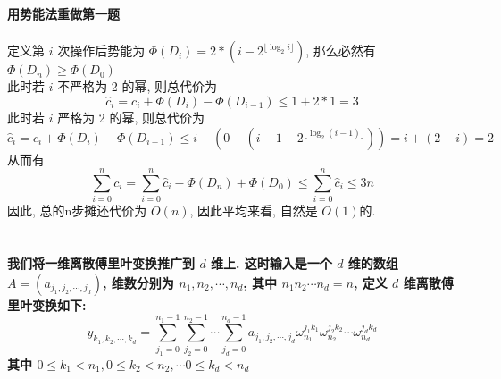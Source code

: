 \documentclass[UTF8]{article}
\newcommand{\jumpLine} {\hspace*{\fill} \\}
\newcommand{\floor}[1]{\lfloor#1\rfloor}
\begin{document}
\section{}
\noindent \textbf{用势能法重做第一题}\\
\jumpLine
定义第 $i$ 次操作后势能为 $\Phi(D_i)=2*(i-2^{\floor{\log_2 i}})$, 那么必然有 $\Phi(D_n)\ge\Phi(D_0)$\\
此时若 $i$ 不严格为 2 的幂, 则总代价为
$$\hat{c}_i=c_i+\Phi(D_i)-\Phi(D_{i-1})\le 1+2*1=3$$
此时若 $i$ 严格为 2 的幂, 则总代价为
$$\hat{c}_i=c_i+\Phi(D_i)-\Phi(D_{i-1})\le i+(0-(i-1-2^{\floor{\log_2 (i-1)}}))=i+(2-i)=2$$
从而有$$\sum\limits_{i=0}^nc_i=\sum\limits_{i=0}^n\hat{c}_i-\Phi(D_n)+\Phi(D_0)\le\sum\limits_{i=0}^n\hat{c}_i\le3n$$
因此, 总的n步摊还代价为 $O(n)$, 因此平均来看, 自然是 $O(1)$的.


\section{}
\noindent \textbf{我们将一维离散傅里叶变换推广到 $d$ 维上. 这时输入是一个 $d$ 维的数组 $A=(a_{j_1,j_2,\cdots,j_d})$, 维数分别为 $n_1,n_2,\cdots,n_d$, 其中 $n_1n_2\cdots n_d=n$, 定义 $d$ 维离散傅里叶变换如下:
$$y_{k_1,k_2,\cdots,k_d}=\sum\limits_{j_1=0}^{n_1-1}\sum\limits_{j_2=0}^{n_2-1}\cdots\sum\limits_{j_d=0}^{n_d-1}a_{j_1,j_2,\cdots,j_d}\omega_{n_1}^{j_1k_1}\omega_{n_2}^{j_2k_2}\cdots\omega_{n_d}^{j_dk_d}$$
其中 $0\le k_1< n_1,0\le k_2< n_2,\cdots 0\le k_d< n_d$}
\end{document}
